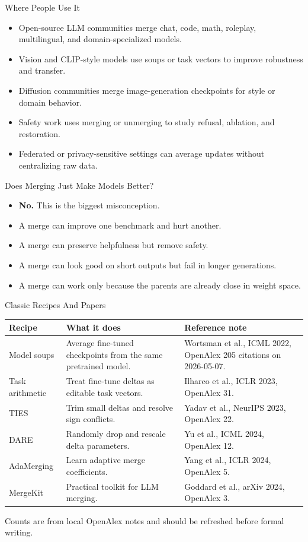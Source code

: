 \documentclass[aspectratio=169]{beamer}
\begin{document}
\begin{frame}{Where People Use It}
\small
\begin{itemize}
  \item Open-source LLM communities merge chat, code, math, roleplay, multilingual, and domain-specialized models.
  \item Vision and CLIP-style models use soups or task vectors to improve robustness and transfer.
  \item Diffusion communities merge image-generation checkpoints for style or domain behavior.
  \item Safety work uses merging or unmerging to study refusal, ablation, and restoration.
  \item Federated or privacy-sensitive settings can average updates without centralizing raw data.
\end{itemize}
\end{frame}

\begin{frame}{Does Merging Just Make Models Better?}
\small
\begin{itemize}
  \item \textbf{No.} This is the biggest misconception.
  \item A merge can improve one benchmark and hurt another.
  \item A merge can preserve helpfulness but remove safety.
  \item A merge can look good on short outputs but fail in longer generations.
  \item A merge can work only because the parents are already close in weight space.
\end{itemize}
\end{frame}

\begin{frame}{Classic Recipes And Papers}
\scriptsize
\begin{tabular}{p{}p{}p{}}
\toprule
Recipe & What it does & Reference note \\
\midrule
Model soups & Average fine-tuned checkpoints from the same pretrained model. & Wortsman et al., ICML 2022, OpenAlex 205 citations on 2026-05-07. \\
Task arithmetic & Treat fine-tune deltas as editable task vectors. & Ilharco et al., ICLR 2023, OpenAlex 31. \\
TIES & Trim small deltas and resolve sign conflicts. & Yadav et al., NeurIPS 2023, OpenAlex 22. \\
DARE & Randomly drop and rescale delta parameters. & Yu et al., ICML 2024, OpenAlex 12. \\
AdaMerging & Learn adaptive merge coefficients. & Yang et al., ICLR 2024, OpenAlex 5. \\
MergeKit & Practical toolkit for LLM merging. & Goddard et al., arXiv 2024, OpenAlex 3. \\
\bottomrule
\end{tabular}
\vspace{0.4em}

\scriptsize Counts are from local OpenAlex notes and should be refreshed before formal writing.

\end{frame}
\end{document}
